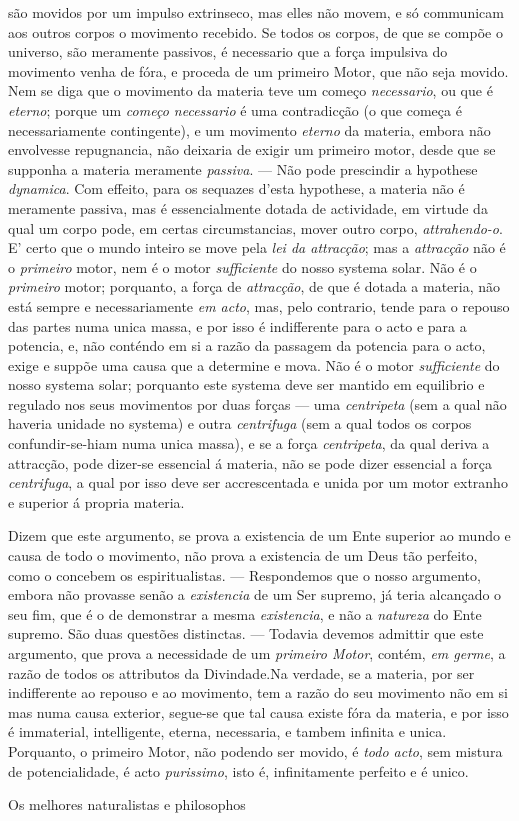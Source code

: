 são movidos por um impulso extrinseco, mas elles não movem, e só communicam aos outros corpos o movimento recebido. Se todos os corpos, de que se compõe o universo, são meramente passivos, é necessario que a força impulsiva do movimento venha de fóra, e proceda de um primeiro Motor, que não seja movido. Nem se diga que o movimento da materia teve um começo \emph{necessario}, ou que é \emph{eterno}; porque um \emph{começo necessario} é uma contradicção (o que começa é necessariamente contingente), e um movimento \emph{eterno} da materia, embora não envolvesse repugnancia, não deixaria de exigir um primeiro motor, desde que se supponha a materia meramente \emph{passiva}. --- Não pode prescindir a hypothese \emph{dynamica}. Com effeito, para os sequazes d'esta hypothese, a materia não é meramente passiva, mas é essencialmente dotada de actividade, em virtude da qual um corpo pode, em certas circumstancias, mover outro corpo, \emph{attrahendo-o}. E' certo que o mundo inteiro se move pela \emph{lei da attracção}; mas a \emph{attracção} não é o \emph{primeiro} motor, nem é o motor \emph{sufficiente} do nosso systema solar. Não é o \emph{primeiro} motor; porquanto, a força de \emph{attracção}, de que é dotada a materia, não está sempre e necessariamente \emph{em acto}, mas, pelo contrario, tende para o repouso das partes numa unica massa, e por isso é indifferente para o acto e para a potencia, e, não conténdo em si a razão da passagem da potencia para o acto, exige e suppõe uma causa que a determine e mova. Não é o motor \emph{sufficiente} do nosso systema solar; porquanto este systema deve ser mantido em equilibrio e regulado nos seus movimentos por duas forças --- uma \emph{centripeta} (sem a qual não haveria unidade no systema) e outra \emph{centrifuga} (sem a qual todos os corpos confundir-se-hiam numa unica massa), e se a força \emph{centripeta}, da qual deriva a attracção, pode dizer-se essencial á materia, não se pode dizer essencial a força \emph{centrifuga}, a qual por isso deve ser accrescentada e unida por um motor extranho e superior á propria materia.\par Dizem que este argumento, se prova a existencia de um Ente superior ao mundo e causa de todo o movimento, não prova a existencia de um Deus tão perfeito, como o concebem os espiritualistas. --- Respondemos que o nosso argumento, embora não provasse senão a \emph{existencia} de um Ser supremo, já teria alcançado o seu fim, que é o de demonstrar a mesma \emph{existencia}, e não a \emph{natureza} do Ente supremo. São duas questões distinctas. --- Todavia devemos admittir que este argumento, que prova a necessidade de um \emph{primeiro Motor}, contém, \emph{em germe}, a razão de todos os attributos da Divindade.Na verdade, se a materia, por ser indifferente ao repouso e ao movimento, tem a razão do seu movimento não em si mas numa causa exterior, segue-se que tal causa existe fóra da materia, e por isso é immaterial, intelligente, eterna, necessaria, e tambem infinita e unica. Porquanto, o primeiro Motor, não podendo ser movido, é \emph{todo acto}, sem mistura de potencialidade, é acto \emph{purissimo}, isto é, infinitamente perfeito e é unico.\par Os melhores naturalistas e philosophos 